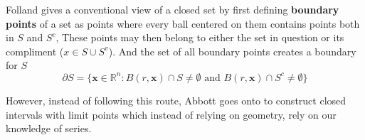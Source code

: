 Folland gives a conventional view of a closed set by first defining \textbf{boundary points}
of a set as points where every ball centered on them contains points both in $S$ and $S^c$,
These points may then belong to either the set in question or its compliment ($x\in S \cup S^v$).
And the set of all boundary points creates a boundary for $S$
$$
\partial S = \{ \mathbf{x}\in\mathbb{R}^n : B(r,\mathbf{x})\cap S \neq \emptyset \text{ and }
    B(r,\mathbf{x})\cap S^c \neq \emptyset \}
$$

However, instead of following this route, Abbott goes onto to construct closed intervals
with limit points which instead of relying on geometry, rely on our knowledge of series.